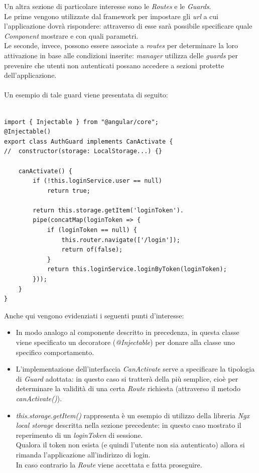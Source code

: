 \documentclass[12pt]{article}
\begin{document}
Un altra sezione di particolare interesse sono le \textit{Routes} e le \textit{Guards}.\\
Le prime vengono utilizzate dal framework per impostare gli \textit{url} a cui l'applicazione dovrà rispondere: attraverso di esse sarà possibile specificare quale \textit{Component} mostrare e con quali parametri.\\
Le seconde, invece, possono essere associate a \textit{routes} per determinare la loro attivazione in base alle condizioni inserite: \textit{manager} utilizza delle \textit{guards} per prevenire che utenti non autenticati possano accedere a sezioni protette dell'applicazione.\\\\
Un esempio di tale guard viene presentata di seguito:
\begin{lstlisting}

import { Injectable } from "@angular/core";
@Injectable()
export class AuthGuard implements CanActivate {
//  constructor(storage: LocalStorage...) {}

    canActivate() {
        if (!this.loginService.user == null)
            return true;

        return this.storage.getItem('loginToken').
        pipe(concatMap(loginToken => {
            if (loginToken == null) {
                this.router.navigate(['/login']);
                return of(false);
            }
            return this.loginService.loginByToken(loginToken);
        }));
    }
}
\end{lstlisting}
Anche qui vengono evidenziati i seguenti punti d'interesse:
\begin{itemize}
\item In modo analogo al componente descritto in precedenza, in questa classe viene specificato un decoratore (\textit{@Injectable}) per donare alla classe uno specifico comportamento.
\item L'implementazione dell'interfaccia \textit{CanActivate} serve a specificare la tipologia di \textit{Guard} adottata: in questo caso si tratterà della più semplice, cioè per determinare la validità di una certa \textit{Route} richiesta (attraverso il metodo \textit{canActivate()}).
\item \textit{this.storage.getItem()} rappresenta è un esempio di utilizzo della libreria \textit{Ngx local storage} descritta nella sezione precedente: in questo caso mostrato il reperimento di un \textit{loginToken} di sessione.\\
Qualora il token non esista (e quindi l'utente non sia autenticato) allora si rimanda l'applicazione all'indirizzo di login.\\
In caso contrario la \textit{Route} viene accettata e fatta proseguire.
\end{itemize}
\newpage
\end{document}
